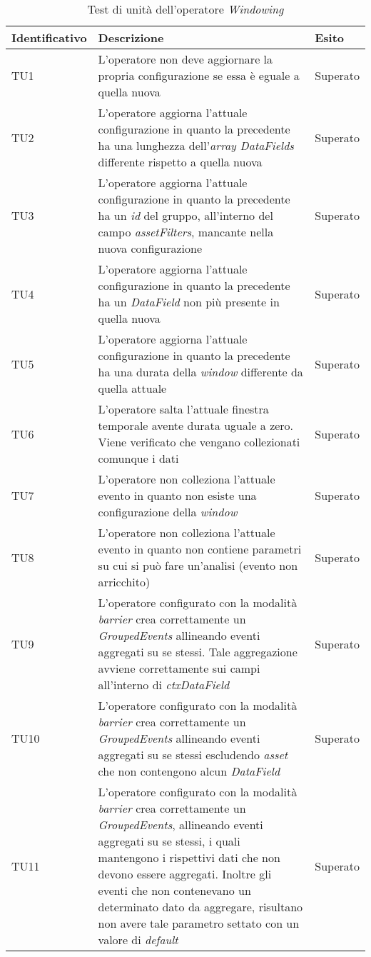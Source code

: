 {
\centering
\begin{longtable}{L{3cm} L{8.5cm} L{2cm}}
\caption{Test di unità dell'operatore \textit{Windowing}}\\
\textbf{Identificativo} &
\textbf{Descrizione}&
\textbf{Esito}\\
\endhead
\hline

TU1 & L'operatore non deve aggiornare la propria configurazione se essa è eguale a quella nuova & Superato \\
\hline
TU2 & L'operatore aggiorna l'attuale configurazione in quanto la precedente ha una lunghezza dell'\textit{array DataFields} differente rispetto a quella nuova & Superato \\
\hline
TU3 & L'operatore aggiorna l'attuale configurazione in quanto la precedente ha un \textit{id} del gruppo, all'interno del campo \textit{assetFilters}, mancante nella nuova configurazione & Superato\\
\hline
TU4 & L'operatore aggiorna l'attuale configurazione in quanto la precedente ha un \textit{DataField} non più presente in quella nuova & Superato \\
\hline
TU5 & L'operatore aggiorna l'attuale configurazione in quanto la precedente ha una durata della \textit{window} differente da quella attuale & Superato\\
\hline
TU6 & L'operatore salta l'attuale finestra temporale avente durata uguale a zero. Viene verificato che vengano collezionati comunque i dati & Superato \\
\hline
TU7 & L'operatore non colleziona l'attuale evento in quanto non esiste una configurazione della \textit{window} & Superato \\
\hline
TU8 & L'operatore non colleziona l'attuale evento in quanto non contiene parametri su cui si può fare un'analisi (evento non arricchito) & Superato \\
\hline
TU9 & L'operatore configurato con la modalità \textit{barrier} crea correttamente un \textit{GroupedEvents} allineando eventi aggregati su se stessi. Tale aggregazione avviene correttamente sui campi all'interno di \textit{ctxDataField} & Superato \\
\hline
TU10 & L'operatore configurato con la modalità \textit{barrier} crea correttamente un \textit{GroupedEvents} allineando eventi aggregati su se stessi escludendo \textit{asset} che non contengono alcun \textit{DataField} & Superato \\
\hline
TU11 & L'operatore configurato con la modalità \textit{barrier} crea correttamente un \textit{GroupedEvents}, allineando eventi aggregati su se stessi, i quali mantengono i rispettivi dati che non devono essere aggregati. Inoltre gli eventi che non contenevano un determinato dato da aggregare, risultano non avere tale parametro settato con un valore di \textit{default} & Superato \\

\end{longtable}}
